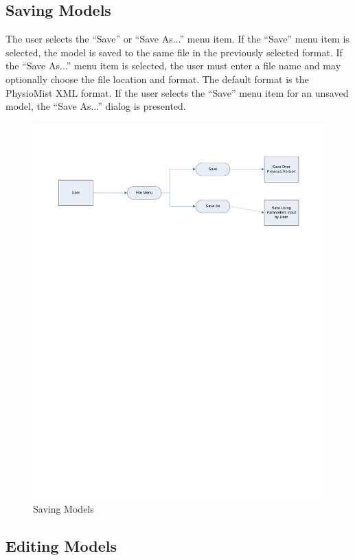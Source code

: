 \documentclass{article}
\begin{document}
\subsection{Saving Models}
The user selects the ``Save'' or ``Save As...'' menu item. If the ``Save'' menu item is selected, the model is saved to the same file in the previously selected format. If the ``Save As...'' menu item is selected, the user must enter a file name and may optionally choose the file location and format. The default format is the PhysioMist XML format. If the user selects the ``Save'' menu item for an unsaved model, the ``Save As...'' dialog is presented.
\begin{figure}[!htb]
\centering
\includegraphics[width=\textwidth]{./diagrams/save}
\caption{Saving Models}
\end{figure}
\subsection{Editing Models}
\end{document}
